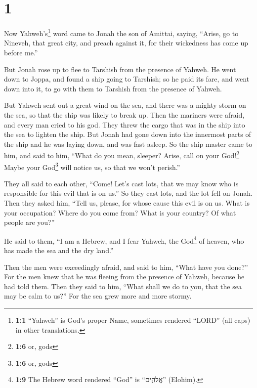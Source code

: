 \hypertarget{section}{%
\section{1}\label{section}}

 Now Yahweh's\footnote{\textbf{1:1} ``Yahweh'' is God's
  proper Name, sometimes rendered ``LORD'' (all caps) in other
  translations.} word came to Jonah the son of Amittai, saying,
 ``Arise, go to Nineveh, that great city, and preach
against it, for their wickedness has come up before me.''

 But Jonah rose up to flee to Tarshish from the presence
of Yahweh. He went down to Joppa, and found a ship going to Tarshish; so
he paid its fare, and went down into it, to go with them to Tarshish
from the presence of Yahweh.

 But Yahweh sent out a great wind on the sea, and there
was a mighty storm on the sea, so that the ship was likely to break up.
 Then the mariners were afraid, and every man cried to his
god. They threw the cargo that was in the ship into the sea to lighten
the ship. But Jonah had gone down into the innermost parts of the ship
and he was laying down, and was fast asleep.  So the ship
master came to him, and said to him, ``What do you mean, sleeper? Arise,
call on your God!\footnote{\textbf{1:6} or, gods} Maybe your
God\footnote{\textbf{1:6} or, gods} will notice us, so that we won't
perish.''

 They all said to each other, ``Come! Let's cast lots,
that we may know who is responsible for this evil that is on us.'' So
they cast lots, and the lot fell on Jonah.  Then they
asked him, ``Tell us, please, for whose cause this evil is on us. What
is your occupation? Where do you come from? What is your country? Of
what people are you?''

 He said to them, ``I am a Hebrew, and I fear Yahweh, the
God\footnote{\textbf{1:9} The Hebrew word rendered ``God'' is
  ``אֱלֹהִ֑ים'' (Elohim).} of heaven, who has made the sea and the dry
land.''

 Then the men were exceedingly afraid, and said to him,
``What have you done?'' For the men knew that he was fleeing from the
presence of Yahweh, because he had told them.  Then they
said to him, ``What shall we do to you, that the sea may be calm to
us?'' For the sea grew more and more stormy.

